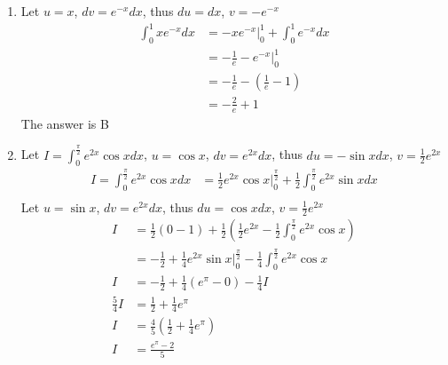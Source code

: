 \documentclass{article}
\numberwithin{equation}{section}
\begin{document}
\begin{enumerate}
    \item Let $u = x$, $dv = e^{-x}dx$, thus $du = dx$, $v = -e^{-x}$
    \begin{align*}
        \int_{0}^{1} x e^{-x} dx &= -xe^{-x} \Big|_0^1 + \int_{0}^{1} e^{-x} dx\\
        &= -\frac{1}{e} - e^{-x} \Big|_0^1\\
        &= -\frac{1}{e} -\left(\frac{1}{e} - 1\right)\\
        &= -\frac{2}{e} + 1
    \end{align*}
    The answer is B

    \item Let $I = \displaystyle \int_{0}^{\frac{\pi}{2}} e^{2x}\cos x dx$, $u = \cos x$, $dv = e^{2x}dx$, thus $ du = -\sin x dx$, $v = \frac{1}{2}e^{2x}$
    \begin{align*}
        I = \int_{0}^{\frac{\pi}{2}} e^{2x}\cos x dx &= \frac{1}{2}e^{2x} \cos x \Big|_0^{\frac{\pi}{2}} + \frac{1}{2}\int_{0}^{\frac{\pi}{2}} e^{2x} \sin x dx\\
    \end{align*}
    Let $u = \sin x$, $dv = e^{2x}dx$, thus $du = \cos x dx$, $v = \frac{1}{2}e^{2x}$
    \begin{align*}
        I &= \frac{1}{2} (0-1) + \frac{1}{2} \left(\frac{1}{2}e^{2x} - \frac{1}{2}\int_{0}^{\frac{\pi}{2}} e^{2x}\cos x\right)\\
        &= -\frac{1}{2} + \frac{1}{4}e^{2x} \sin x \Big|_0^{\frac{\pi}{2}} - \frac{1}{4} \int_{0}^{\frac{\pi}{2}} e^{2x} \cos x\\
        I &= -\frac{1}{2} + \frac{1}{4}(e^\pi - 0) - \frac{1}{4} I\\
        \frac{5}{4} I &= \frac{1}{2} + \frac{1}{4}e^\pi\\
        I &= \frac{4}{5} \left(\frac{1}{2} + \frac{1}{4} e^\pi\right)\\
        I &= \frac{e^\pi - 2}{5}
    \end{align*}
\end{enumerate}
\end{document}
